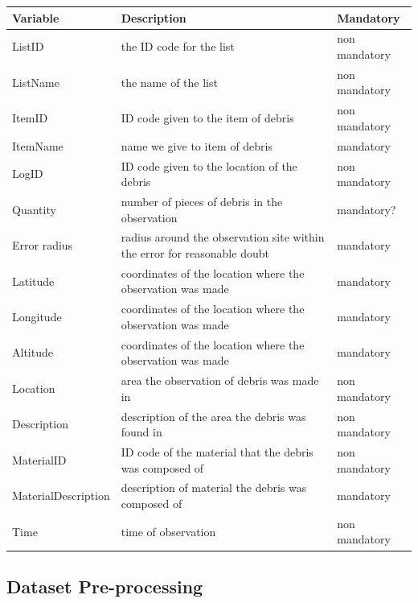 \documentclass[10pt]{article}\usepackage[]{graphicx}\usepackage[]{color}
\begin{document}
\begin{table}[H]
\begin{tabular}{ l l l }
Variable & Description & Mandatory \\
\hline
ListID  & the ID code for the list & non mandatory \\
ListName & the name of the list & non mandatory \\
ItemID & ID code given to the item of debris & non mandatory \\
ItemName & name we give to item of debris & mandatory \\
LogID &  ID code given to the location of the debris & non mandatory \\
Quantity & number of pieces of debris in the observation & mandatory? \\
Error radius & radius around the observation site within the error for reasonable doubt & mandatory \\
Latitude & coordinates of the location where the observation was made & mandatory \\
Longitude & coordinates of the location where the observation was made & mandatory \\
Altitude & coordinates of the location where the observation was made & mandatory \\
Location & area the observation of debris was made in & non mandatory \\
Description & description of the area the debris was found in & non mandatory \\
MaterialID & ID code of the material that the debris was composed of & non mandatory \\
MaterialDescription & description of material the debris was composed of & mandatory\\ 
Time & time of observation & non mandatory \\
\end{tabular}
\end{table}


\pagebreak
\subsection{Dataset Pre-processing}
\end{document}

